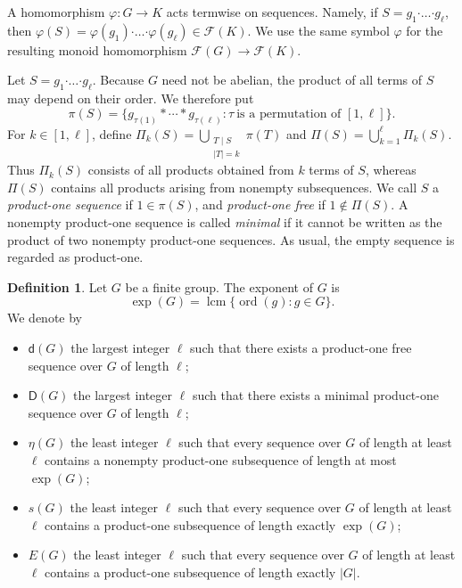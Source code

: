 \documentclass[a4paper, 12pt]{article}
\theoremstyle{definition}
\newtheorem{definition}[theorem]{Definition}
\DeclareMathOperator{\ord}{ord}
\begin{document}
A homomorphism $\varphi:G\to K$ acts termwise on sequences.  Namely, if
$S=g_1\boldsymbol{\cdot}\ldots\boldsymbol{\cdot}g_\ell$, then
$\varphi(S)=\varphi(g_1)\boldsymbol{\cdot}\ldots
\boldsymbol{\cdot}\varphi(g_\ell)\in\mathcal F(K).$
We use the same symbol $\varphi$ for the resulting monoid homomorphism
$\mathcal F(G)\to\mathcal F(K)$.

Let $S=g_1\boldsymbol{\cdot}\ldots\boldsymbol{\cdot}g_\ell$.  Because
$G$ need not be abelian, the product of all terms of $S$ may depend on
their order.  We therefore put
$$\pi(S)=
\bigl\{
g_{\tau(1)}*\cdots*g_{\tau(\ell)}:
\tau\ \text{is a permutation of }[1,\ell]
\bigr\}.$$
For $k\in[1,\ell]$, define
$\Pi_k(S)=\bigcup\limits_{\substack{T\mid S\\ |T|=k}}\pi(T)$ and
$\Pi(S)=\bigcup_{k=1}^{\ell}\Pi_k(S).$
Thus $\Pi_k(S)$ consists of all products obtained from $k$ terms of $S$,
whereas $\Pi(S)$ contains all products arising from nonempty
subsequences.  We call $S$ a \emph{product-one sequence} if
$1\in\pi(S)$, and \emph{product-one free} if $1\notin\Pi(S)$. A nonempty product-one sequence is called \emph{minimal} if it cannot be written as the product of two nonempty product-one sequences.
As usual,
the empty sequence is regarded as product-one.


\begin{samepage}
\begin{definition}\label{definition:invariants}
Let $G$ be a finite group. The exponent of $G$ is
$$\exp(G)=\operatorname{lcm}\{\ord(g):g\in G\}.$$  We denote by
\begin{itemize}
\item[$\bullet$] $\mathsf d(G)$ the largest integer $\ell$ such that
there exists a product-one free sequence over $G$ of length $\ell$;

\item[$\bullet$] $\mathsf D(G)$ the largest integer $\ell$ such that
there exists a minimal product-one sequence over $G$ of length $\ell$;

\item[$\bullet$] $\eta(G)$ the least integer $\ell$ such that every
sequence over $G$ of length at least $\ell$ contains a nonempty
product-one subsequence of length at most $\exp(G)$;

\item[$\bullet$] $s(G)$ the least integer $\ell$ such that every
sequence over $G$ of length at least $\ell$ contains a product-one
subsequence of length exactly $\exp(G)$;

\item[$\bullet$] $E(G)$ the least integer $\ell$ such that every
sequence over $G$ of length at least $\ell$ contains a product-one
subsequence of length exactly $|G|$.
\end{itemize}
\end{definition}
\end{samepage}
\end{document}
